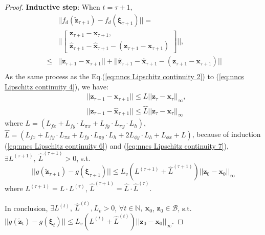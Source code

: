 \documentclass[conference]{IEEEtran}
\newtheorem{proof}{\bf Proof}
\newcommand{\myvec}[1]{\boldsymbol{#1}}
\newcommand{\calB}{\mathcal{B}}
\newcommand{\bbN}{\mathbb{N}}
\begin{document}
\begin{proof}
    \textbf{Inductive step}: When $t = \tau + 1$, 
    \begin{equation}~\label{eq:nncs Lipschitz continuity 8}
      \begin{aligned}
        &||f_{d}(\tilde{\myvec{z}}_{\tau + 1}) - f_{d}(\myvec{\xi}_{\tau+1})|| = \\
        &||\begin{bmatrix}
          \myvec{z}_{\tau +1} - \myvec{x}_{\tau + 1},\\ 
          \hat{\myvec{z}}_{\tau + 1} - \hat{\myvec{x}}_{\tau + 1} - (\myvec{z}_{\tau + 1} - \myvec{x}_{\tau + 1})
        \end{bmatrix}||, \\ 
        \leq& || \myvec{z}_{\tau +1} - \myvec{x}_{\tau +1} || + || \hat{\myvec{z}}_{\tau +1} - \hat{\myvec{x}}_{\tau +1}  - (\myvec{z}_{\tau + 1} - \myvec{x}_{\tau + 1})||\\
      \end{aligned}
    \end{equation}
    As the same process as the Eq.(\ref{eq:nncs Lipschitz continuity 2}) to (\ref{eq:nncs Lipschitz continuity 4}), we have: 
    \begin{subequations}
      \begin{align}
        &||\myvec{z}_{\tau + 1} - \myvec{x}_{\tau + 1}|| \leq L||\myvec{z}_{\tau} - \myvec{x}_{\tau}||_{\infty}, \label{eq:nncs Lipschitz continuity 9}\\
        &||\hat{\myvec{z}}_{\tau + 1} - \hat{\myvec{x}}_{\tau + 1}|| \leq \hat{L}||\myvec{z}_{\tau} - \myvec{x}_{\tau}||_{\infty}\label{eq:nncs Lipschitz continuity 10}
      \end{align}
    \end{subequations}
    where $L = (L_{fx} + L_{fy}\cdot L_{\pi x} + L_{fy}\cdot L_{\pi y}\cdot L_{h})$, 
    $\hat{L} = 
    (L_{fx} + L_{fy}\cdot L_{\pi x} + L_{fy}\cdot L_{\pi y}\cdot L_{h} + 2 L_{\phi y}\cdot L_{h} 
    + L_{\phi x} + L)$, because of induction (\ref{eq:nncs Lipschitz continuity 6}) and (\ref{eq:nncs Lipschitz continuity 7}), 
    $\exists L^{(\tau + 1)},\ \hat{L}^{(\tau + 1)} > 0$, s.t. 
    \begin{equation}\label{eq:nncs Lipschitz continuity 11}
      ||g(\tilde{\myvec{z}}_{\tau + 1}) - g(\myvec{\xi}_{\tau + 1})|| 
        \leq L_{v}(L^{(\tau + 1)} + \hat{L}^{(\tau + 1)})|| \myvec{z}_{0} - \myvec{x}_{0} ||_{\infty}
    \end{equation}
    where $L^{(\tau + 1)} = L\cdot L^{(\tau)}$, $\hat{L}^{(\tau + 1)} = \hat{L}\cdot \hat{L}^{(\tau)}$. 
  
    In conclusion, $\exists L^{(t)},\ \hat{L}^{(t)}, L_{v} > 0$, $\forall t \in \bbN,\ \myvec{x}_{0}$, $\myvec{z}_{0}\in \calB$, 
    s.t. $||g(\tilde{\myvec{z}}_{t}) - g(\myvec{\xi}_{t})|| 
        \leq L_{v}(L^{(t)} + \hat{L}^{(t)})|| \myvec{z}_{0} - \myvec{x}_{0} ||_{\infty}$. 
  
\end{proof}
\end{document}
